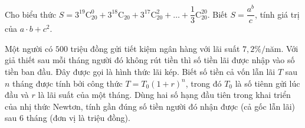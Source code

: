 \begin{ex}%
	Cho biểu thức $S=3^{19}\mathrm{C}_{20}^0+3^{18}\mathrm{C}_{20}+3^{17}\mathrm{C}_{20}^2+\ldots+\dfrac{1}{3}\mathrm{C}_{20}^{20}$. Biết $S=\dfrac{a^b}{c}$, tính giá trị của $a\cdot b+c^2$.
\end{ex}
\begin{ex}%
	Một người có $500$ triệu đồng gửi tiết kiệm ngân hàng với lãi suất $7,2\%/$năm. Với giả thiết sau mỗi tháng người đó không rút tiền thì số tiền lãi được nhập vào số tiền ban đầu. Đây được gọi là hình thức lãi kép. Biết số tiền cả vốn lẫn lãi $T$ sau $n$ tháng được tính bởi công thức $T=T_0(1+r)^n$, trong đó $T_0$ là số tiênn gửi lúc đầu và $r$ là lãi suất của một tháng. Dùng hai số hạng đầu tiên trong khai triển của nhị thức Newtơn, tính gần đúng số tiền người đó nhận được (cả gốc lẫn lãi) sau $6$ tháng (đơn vị là triệu đồng).
\end{ex}
